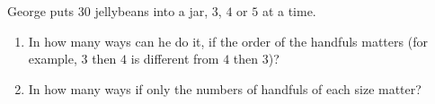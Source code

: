 George puts $30$ jellybeans into a jar, $3$, $4$ or $5$ at a time.
\begin{enumerate}
\item[(a)] In how many ways can he do it, if the order of the handfuls matters (for example, $3$ then $4$ is different from $4$ then $3$)?
\item[(b)] In how many ways if only the numbers of handfuls of each size matter?
\end{enumerate}
